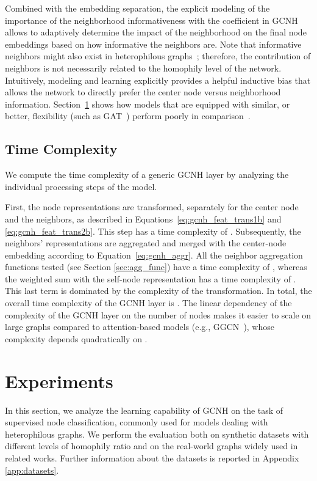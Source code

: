 \documentclass[conference]{IEEEtran}
\begin{document}
Combined with the embedding separation, the explicit modeling of the importance of the neighborhood informativeness with the coefficient  in GCNH allows to adaptively determine the impact of the neighborhood on the final node embeddings based on how informative the neighbors are.
Note that informative neighbors might also exist in heterophilous graphs~\cite{ma_is_2022, cavallo_2ncs_2022}; therefore, the contribution of neighbors is not necessarily related to the homophily level of the network.
Intuitively, modeling and learning  explicitly provides a helpful inductive bias that allows the network to directly prefer the center node versus neighborhood information. Section~\ref{sec:experiments} shows how models that are equipped with similar, or better, flexibility (such as GAT~\cite{velickovic_graph_2018}) perform poorly in comparison~\cite{lim_large_2021}.

\subsection{Time Complexity}\label{sec:complexity}
We compute the time complexity of a generic GCNH layer  by analyzing the individual processing steps of the model.

First, the node representations  are transformed, separately for the center node and the neighbors, as described in Equations~\eqref{eq:gcnh_feat_trans1b} and \eqref{eq:gcnh_feat_trans2b}. This step has a time complexity of . Subsequently, the neighbors' representations are aggregated and merged with the center-node embedding according to Equation~\eqref{eq:gcnh_aggr}. All the neighbor aggregation functions tested (see Section \ref{sec:agg_func}) have a time complexity of , whereas the weighted sum with the self-node representation has a time complexity of . This last term is dominated by the complexity of the transformation. In total, the overall time complexity of the GCNH layer is . The linear dependency of the complexity of the GCNH layer on the number of nodes  makes it easier to scale on large graphs compared to attention-based models (e.g., GGCN~\cite{yan_two_2021}), whose complexity depends quadratically on .


\section{Experiments}\label{sec:experiments}
 
In this section, we analyze the learning capability of GCNH on the task of supervised node classification, commonly used for models dealing with heterophilous graphs. We perform the evaluation both on synthetic datasets with different levels of homophily ratio and on the real-world graphs widely used in related works. Further information about the datasets is reported in Appendix \ref{app:datasets}.
\end{document}
